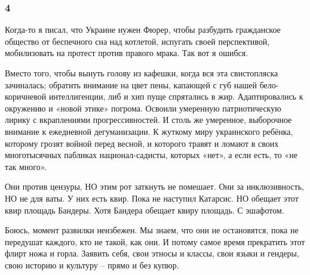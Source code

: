  
 
 
 
 

\subsubsection{4}

Когда-то я писал, что Украине нужен Фюрер, чтобы разбудить гражданское общество
от беспечного сна над котлетой, испугать своей перспективой, мобилизовать на
протест против правого мрака. Так вот я ошибся. 

Вместо того, чтобы вынуть голову из кафешки, когда вся эта свистопляска
зачиналась; обратить внимание на цвет пены, капающей с губ нашей
бело-коричневой интеллигенции, либ и хип пуще спрятались в жир. Адаптировались
к окружению и «новой этике» погрома. Освоили умеренную патриотическую лирику с
вкраплениями прогрессивностей. И столь же умеренное, выборочное внимание к
ежедневной дегуманизации. К жуткому миру украинского ребёнка, которому грозят
войной перед весной, и которого травят и ломают в своих многотысячных пабликах
национал-садисты, которых «нет», а если есть, то «не так много».

Они против цензуры, НО этим рот заткнуть не помешает. Они за инклюзивность, НО
не для ваты. У них есть квир. Пока не наступил Катарсис. НО обещает этот квир
площадь Бандеры. Хотя Бандера обещает квиру площадь. С эшафотом.

Боюсь, момент развилки неизбежен. Мы знаем, что они не остановятся, пока не
передушат каждого, кто не такой, как они. И потому самое время прекратить этот
флирт ножа и горла. Заявить себя, свои этносы и классы, свои языки и гендеры,
свою историю и культуру – прямо и без купюр.
